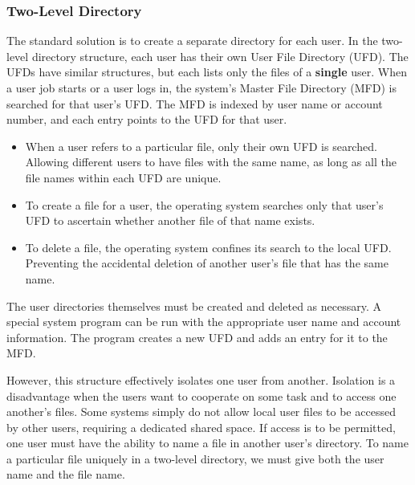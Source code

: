 \subsubsection{Two-Level Directory}\label{subsubsec:Two_Level_Directory}
The standard solution is to create a separate directory for each user.
In the two-level directory structure, each user has their own User File Directory (UFD).
The UFDs have similar structures, but each lists only the files of a \textbf{single} user.
When a user job starts or a user logs in, the system’s Master File Directory (MFD) is searched for that user's UFD.\@
The MFD is indexed by user name or account number, and each entry points to the UFD for that user.

\begin{itemize}[noitemsep]
\item When a user refers to a particular file, only their own UFD is searched.
  Allowing different users to have files with the same name, as long as all the file names within each UFD are unique.
\item To create a file for a user, the operating system searches only that user’s UFD to ascertain whether another file of that name exists.
\item To delete a file, the operating system confines its search to the local UFD.\@
  Preventing the accidental deletion of another user’s file that has the same name.
\end{itemize}

The user directories themselves must be created and deleted as necessary.
A special system program can be run with the appropriate user name and account information.
The program creates a new UFD and adds an entry for it to the MFD.\@

However, this structure effectively isolates one user from another.
Isolation is a disadvantage when the users want to cooperate on some task and to access one another's files.
Some systems simply do not allow local user files to be accessed by other users, requiring a dedicated shared space.
If access is to be permitted, one user must have the ability to name a file in another user’s directory.
To name a particular file uniquely in a two-level directory, we must give both the user name and the file name.

